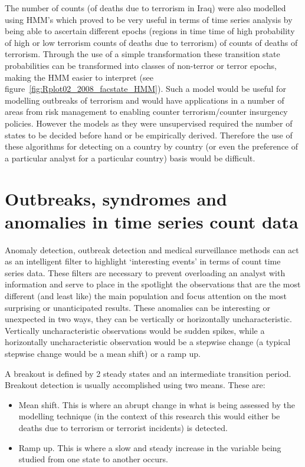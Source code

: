 The number of counts (of deaths due to terrorism in Iraq) were also modelled using HMM's which proved to be very useful in terms of time series analysis by being able to ascertain different epochs (regions in time time of high probability of high or low terrorism counts of deaths due to terrorism) of counts of deaths of terrorism. Through the use of a simple transformation these transition state probabilities can be transformed into classes of non-terror or terror epochs, making the HMM easier to interpret (see figure~\ref{fig:Rplot02_2008_facstate_HMM}). Such a model would be useful for modelling outbreaks of terrorism and would have applications in a number of areas from risk management to enabling counter terrorism/counter insurgency policies. However the models as they were unsupervised required the number of states to be decided before hand or be empirically derived. Therefore the use of these algorithms for detecting  on a country by country (or even the preference of a particular analyst for a particular country) basis would be difficult.

\section{Outbreaks, syndromes and anomalies in  time series count data} 

Anomaly detection, outbreak detection and medical surveillance methods can act as an intelligent filter to highlight ‘interesting events’ in terms of count time series data. These filters are necessary to prevent overloading an analyst with information and serve to place in the spotlight the observations that are the most different (and least like) the main population and focus attention on the most surprising or unanticipated results. These anomalies can be interesting or unexpected in two ways, they can be vertically or horizontally uncharacteristic. Vertically uncharacteristic observations would be sudden spikes, while a horizontally uncharacteristic observation would be a stepwise change (a typical stepwise change would be a mean shift) or a ramp up.

A breakout is defined by 2 steady states and an intermediate transition period. Breakout detection is usually accomplished using two means. These are:
\begin{itemize}
\item Mean shift. This is where an abrupt change in what is being assessed by the modelling technique (in the context of this research this would either be deaths due to terrorism or terrorist incidents) is detected. 
\item Ramp up. This is where a slow and steady increase in the variable being studied from one state to another occurs.
\end{itemize}

